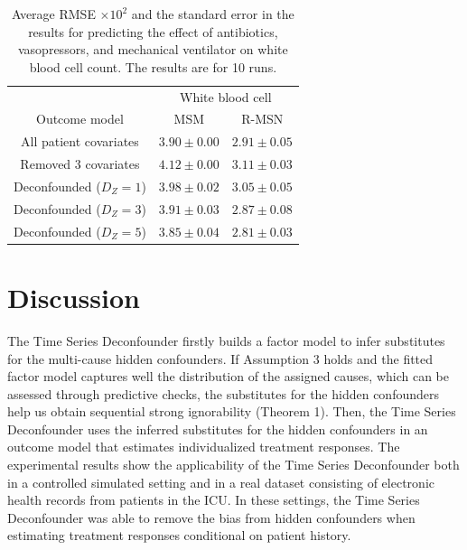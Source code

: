 \documentclass{article}
\begin{document}
	\begin{table}[ht]
		\caption{Average  RMSE $\times 10^2$  and the standard error in the results for predicting the effect of antibiotics, vasopressors, and mechanical ventilator on white blood cell count. The results are for 10 runs.}
		\label{tab:mimic_rm}
		\begin{center}
			\begin{small}
				\begin{tabular}{c|cc}
					\toprule
					& \multicolumn{2}{c}{White blood cell}  \\
					Outcome model  & MSM & R-MSN   \\
					\hline
					All patient covariates  & $3.90 \pm 0.00$  &  $2.91 \pm 0.05$  \\
					Removed 3 covariates  & $4.12 \pm 0.00$  &  $3.11 \pm 0.03$  \\
					\hline
					Deconfounded ($D_Z = 1$) & $3.98 \pm 0.02$  & $3.05 \pm 0.05$ \\
					Deconfounded ($D_Z = 3$)  &  $3.91 \pm 0.03$ & $2.87 \pm 0.08$  \\
					Deconfounded ($D_Z = 5$)  & $3.85 \pm 0.04$  & $2.81 \pm 0.03$ \\
					\bottomrule
				\end{tabular}
			\end{small}
		\end{center}
		\vspace{-0.4cm}
	\end{table}
	
	\section{Discussion}
	
	The Time Series Deconfounder firstly builds a factor model to infer substitutes for the multi-cause hidden confounders. If Assumption 3 holds and the fitted factor model captures well the distribution of the assigned causes, which can be assessed through predictive checks, the substitutes for the hidden confounders help us obtain sequential strong ignorability (Theorem 1).  Then, the Time Series Deconfounder uses the inferred substitutes for the hidden confounders in an outcome model that estimates individualized treatment responses. The experimental results show the applicability of the Time Series Deconfounder both in a controlled simulated setting and in a real dataset consisting of electronic health records from patients in the ICU. In these settings, the Time Series Deconfounder was able to remove the bias from hidden confounders when estimating treatment responses conditional on patient history. 
	
\end{document}
